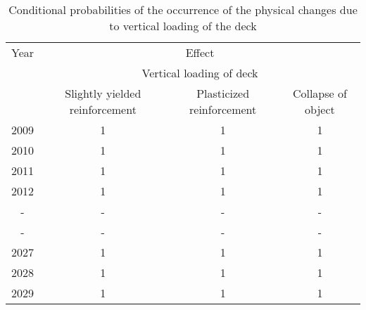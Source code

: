 \begin{table}
	\centering
	\caption{Conditional probabilities of the occurrence of the physical changes due to vertical loading of the deck} \label{tbleventfault:5}
\begin{tabular}{|c|c|c|c|}
\hline
Year & \multicolumn{3}{c|}{Effect} \\ 
\cline{2-4}
 & \multicolumn{3}{c|}{Vertical loading of deck} \\ 
\cline{2-4}
 & Slightly yielded reinforcement & Plasticized reinforcement & Collapse of object \\ 
\hline
2009 & 1 & 1 & 1 \\ 
\hline
2010 & 1 & 1 & 1 \\ 
\hline
2011 & 1 & 1 & 1 \\ 
\hline
2012 & 1 & 1 & 1 \\ 
\hline
- & - & - & - \\ 
- & - & - & - \\ 
\hline
2027 & 1 & 1 & 1 \\ 
\hline
2028 & 1 & 1 & 1 \\ 
\hline
2029 & 1 & 1 & 1 \\ 
\hline
\end{tabular}
\end{table}

